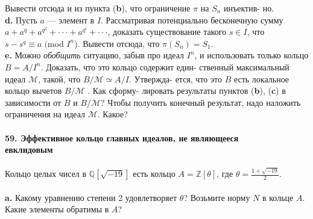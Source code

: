 Вывести отсюда и из пункта (\textbf{b}), что ограничение $\pi$ на $S_n$ инъектив-\linebreak
но.
\\
\hspace*{10pt}\textbf{d.} Пусть $a$ — элемент в $I$. Рассматривая потенциально бесконечную\linebreak
сумму $a+a^q+a^{q^2}+\cdot\cdot\cdot+ a^{q^i}+\cdot\cdot\cdot$, доказать существование такого $s\in I$,\linebreak
что $s-s^q\equiv a\;($mod $I^n$). Вывести отсюда, что $\pi(S_n)=S_1$.
\\
\hspace*{10pt}\textbf{e.} Можно \textit{обобщить} ситуацию, забыв про идеал $I^n$, и использовать\linebreak
только кольцо $B=A/I^n$. Доказать, что это кольцо содержит един-\linebreak
ственный максимальный идеал $\mathcal{M}$, такой, что $B/\mathcal{M}\simeq A/I$. Утвержда-\linebreak
ется, что это $B$ есть локальное кольцо вычетов $B/\mathcal{M}$ . Как сформу-\linebreak
лировать результаты пунктов (\textbf{b}), (\textbf{c}) в зависимости от $B$ и $B/\mathcal{M}$?\linebreak
Чтобы получить конечный результат, надо наложить ограничения на\linebreak
идеал $\mathcal{M}$. Какое?
\\
\\
\noindent\textbf{59. Эффективное кольцо главных идеалов, не являющееся\\
евклидовым}\\\\
\hspace*{10pt} Кольцо целых чисел в $\mathbb{Q}[\sqrt{-19}]$ есть кольцо $A=\mathbb{Z}[\theta]$, где $\theta=\frac{1+\sqrt{-19}}{2}$.
\\\\
\hspace*{10pt}\textbf{a.} Какому уравнению степени 2 удовлетворяет $\theta$? Возьмите норму\linebreak
$N$ в кольце $A$. Какие элементы обратимы в $A$?\pagebreak


